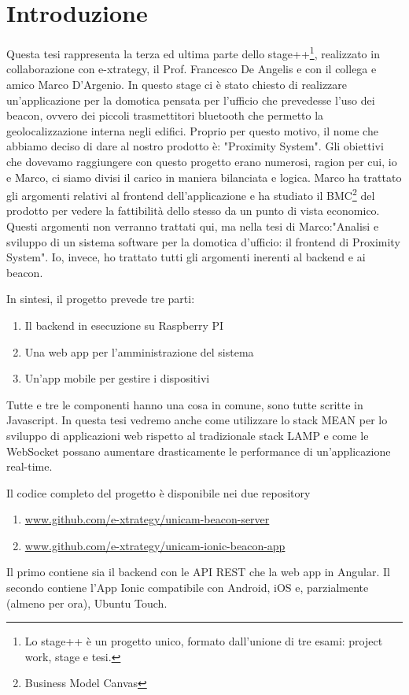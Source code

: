 \chapter{Introduzione}
\label{chap:intro}

Questa tesi rappresenta la terza ed ultima parte dello stage++\footnote{Lo stage++ è un progetto unico, formato dall'unione di tre esami: project work, stage e tesi.},
realizzato in collaborazione con e-xtrategy, il Prof. Francesco De Angelis e con il collega e amico Marco D'Argenio.
In questo stage ci è stato chiesto di realizzare un'applicazione per la domotica pensata per l'ufficio che prevedesse l'uso dei beacon, ovvero dei piccoli trasmettitori bluetooth che permetto la geolocalizzazione interna negli edifici. 
Proprio per questo motivo, il nome che abbiamo deciso di dare al nostro prodotto è: "Proximity System".
Gli obiettivi che dovevamo raggiungere con questo progetto erano numerosi, ragion per cui, io e Marco, ci siamo divisi il carico in maniera bilanciata e logica.
Marco ha trattato gli argomenti relativi al frontend dell'applicazione e ha studiato il BMC\footnote{Business Model Canvas} del prodotto per vedere la fattibilità dello stesso da un punto di vista economico. 
Questi argomenti non verranno trattati qui, ma nella tesi di Marco:"Analisi e sviluppo di un sistema software per la domotica d'ufficio: il frontend di Proximity System".
Io, invece, ho trattato tutti gli argomenti inerenti al backend e ai beacon. 

In sintesi, il progetto prevede tre parti: 
\begin{enumerate}
\item Il backend in esecuzione su Raspberry PI
\item Una web app per l'amministrazione del sistema
\item Un'app mobile per gestire i dispositivi
\end{enumerate}
Tutte e tre le componenti hanno una cosa in comune, sono tutte scritte in Javascript.
In questa tesi vedremo anche come utilizzare lo stack MEAN per lo sviluppo di applicazioni web rispetto al tradizionale stack LAMP e come le WebSocket possano aumentare drasticamente le performance di un'applicazione real-time.

Il codice completo del progetto è disponibile nei due repository
\begin{enumerate}
\item \url{www.github.com/e-xtrategy/unicam-beacon-server}
\item \url{www.github.com/e-xtrategy/unicam-ionic-beacon-app}
\end{enumerate} 
Il primo contiene sia il backend con le API REST che la web app in Angular.
Il secondo contiene l'App Ionic compatibile con Android, iOS e, parzialmente (almeno per ora), Ubuntu Touch. 

